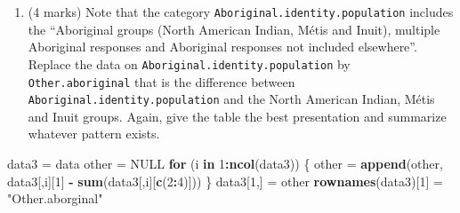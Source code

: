 \documentclass[9pt,letter]{article}
\newenvironment{Shaded}{\begin{snugshade}}{\end{snugshade}}
\newcommand{\KeywordTok}[1]{\textcolor[rgb]{0.13,0.29,0.53}{\textbf{#1}}}
\newcommand{\DecValTok}[1]{\textcolor[rgb]{0.00,0.00,0.81}{#1}}
\newcommand{\StringTok}[1]{\textcolor[rgb]{0.31,0.60,0.02}{#1}}
\newcommand{\OtherTok}[1]{\textcolor[rgb]{0.56,0.35,0.01}{#1}}
\newcommand{\ControlFlowTok}[1]{\textcolor[rgb]{0.13,0.29,0.53}{\textbf{#1}}}
\newcommand{\OperatorTok}[1]{\textcolor[rgb]{0.81,0.36,0.00}{\textbf{#1}}}
\newcommand{\NormalTok}[1]{#1}
\providecommand{\tightlist}{%
  \setlength{\itemsep}{0pt}\setlength{\parskip}{0pt}}
\begin{document}
\begin{enumerate}
\def\labelenumi{(\alph{enumi})}
\setcounter{enumi}{1}
\tightlist
\item
  (4 marks) Note that the category
  \texttt{Aboriginal.identity.population} includes the ``Aboriginal
  groups (North American Indian, Métis and Inuit), multiple Aboriginal
  responses and Aboriginal responses not included elsewhere''. Replace
  the data on \texttt{Aboriginal.identity.population} by
  \texttt{Other.aboriginal} that is the difference between
  \texttt{Aboriginal.identity.population} and the North American Indian,
  Métis and Inuit groups. Again, give the table the best presentation
  and summarize whatever pattern exists.
\end{enumerate}

\begin{Shaded}
\begin{Highlighting}[]
\NormalTok{data3 =}\StringTok{ }\NormalTok{data}
\NormalTok{other =}\StringTok{ }\OtherTok{NULL}
\ControlFlowTok{for}\NormalTok{ (i }\ControlFlowTok{in} \DecValTok{1}\OperatorTok{:}\KeywordTok{ncol}\NormalTok{(data3)) \{ }
\NormalTok{  other =}\StringTok{ }\KeywordTok{append}\NormalTok{(other, data3[,i][}\DecValTok{1}\NormalTok{] }\OperatorTok{-}\StringTok{ }\KeywordTok{sum}\NormalTok{(data3[,i][}\KeywordTok{c}\NormalTok{(}\DecValTok{2}\OperatorTok{:}\DecValTok{4}\NormalTok{)]))}
\NormalTok{\}}
\NormalTok{data3[}\DecValTok{1}\NormalTok{,] =}\StringTok{ }\NormalTok{other}
\KeywordTok{rownames}\NormalTok{(data3)[}\DecValTok{1}\NormalTok{] =}\StringTok{ "Other.aborginal"}


\end{Highlighting}
\end{Shaded}
\end{document}
